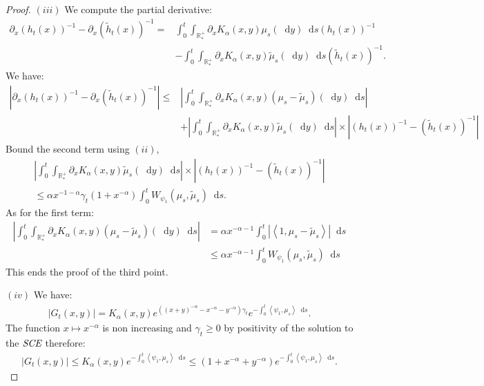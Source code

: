 \documentclass[11pt,a4paper]{article}
\newcommand{\RRP}{\mathbb{R}^+_*}
\newcommand{\SCE}{\emph{SCE}}
\newcommand{\brac}[1]{\left\langle#1\right\rangle}
\newcommand{\dd}{\mathop{}\!\mathrm{d}}
\begin{document}
\begin{proof}
    $(iii)$ We compute the partial derivative:
    \begin{align*}
        \partial_x \left( h_t(x)\right)^{-1}- \partial_x\left( \tilde{h}_t(x)\right)^{-1} =& \int_0^t \int_{\RRP} \partial_x K_\alpha(x,y) \mu_s(\dd y) \dd s \left( h_t(x)\right)^{-1} \\
        &- \int_0^t \int_{\RRP} \partial_x K_\alpha(x,y) \tilde{\mu}_s(\dd y) \dd s \left( \tilde{h}_t(x)\right)^{-1}.
    \end{align*}
    We have:
    \begin{align*}
        \left|\partial_x \left( h_t(x)\right)^{-1}- \partial_x\left( \tilde{h}_t(x)\right)^{-1} \right| \leq& \left|\int_0^t \int_{\RRP} \partial_x K_\alpha(x,y) \left( \mu_s - \tilde{\mu}_s\right)(\dd y) \dd s\right| \\
        &+ \left|\int_0^t \int_{\RRP} \partial_x K_\alpha(x,y) \tilde{\mu}_s(\dd y) \dd s\right| \times \left|\left( h_t(x)\right)^{-1}-\left( \tilde{h}_t(x)\right)^{-1} \right|
    \end{align*}
    Bound the second term using $(ii)$,
    \begin{multline*}
        \left|\int_0^t \int_{\RRP} \partial_x K_\alpha(x,y) \tilde{\mu}_s(\dd y) \dd s\right| \times \left|\left( h_t(x)\right)^{-1}-\left( \tilde{h}_t(x)\right)^{-1} \right| \\
        \leq \alpha x^{-1-\alpha} \gamma_t (1 + x^{-\alpha})\int_0^t W_{\psi_1}\left(\mu_s,\tilde{\mu}_s \right)\dd s.
    \end{multline*}
    As for the first term:
    \begin{align*}
        \left|\int_0^t \int_{\RRP} \partial_x K_\alpha(x,y) \left( \mu_s - \tilde{\mu}_s\right)(\dd y) \dd s\right| 
        &= \alpha x^{-\alpha-1} \int_0^t \left|\brac{1,\mu_s - \tilde{\mu}_s}\right| \dd s\\
        &\leq \alpha x^{-\alpha-1}\int_0^t W_{\psi_1} (\mu_s,\tilde{\mu}_s)\dd s
    \end{align*}
    This ends the proof of the third point.

    $(iv)$ We have:
    \begin{align*}
        \left|G_t(x,y)\right| = K_\alpha(x,y) e^{\left((x+y)^{-\alpha} - x^{-\alpha}- y^{-\alpha}\right)\gamma_t} e^{-\int_0^t \brac{\psi_1,\mu_s}\dd s}.
    \end{align*}
    The function $x \mapsto x^{-\alpha}$ is non increasing and $\gamma_t \geq 0$ by positivity of the solution to the $\SCE$ therefore:
    \begin{align*}
        \left|G_t(x,y)\right| \leq K_\alpha(x,y)e^{-\int_0^t \brac{\psi_1,\mu_s}\dd s} \leq (1 + x^{-\alpha} + y^{-\alpha})e^{-\int_0^t \brac{\psi_1,\mu_s}\dd s}.
    \end{align*}


\end{proof}
\end{document}
